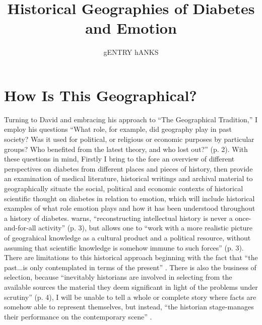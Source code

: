 \documentclass[12pt]{article}
\title{Historical Geographies of Diabetes and Emotion}
\author{gENTRY hANKS}
\begin{document}
\maketitle



\newpage
\section{How Is This Geographical?}
\doublespacing
Turning to David \citet{livingstone_geographical_1993} and embracing his approach to ``The Geographical Tradition,'' I employ his questions ``What role, for example, did geography play in past society? Was it used for political, or religious or economic purposes by particular groups? Who benefited from the latest theory, and who lost out?'' (p. 2).  With these questions in mind, Firstly I bring to the fore an overview of different perspectives on diabetes from different places and pieces of history, then provide an examination of medical literature, historical writings and archival material to geographically situate the social, political and economic contexts of historical scientific thought on diabetes in relation to emotion, which will include historical examples of what role emotion plays and how it has been understood throughout a history of diabetes. \citet{livingstone_geographical_1993} warns, ``reconstructing intellectual history is never a once-and-for-all activity'' (p. 3), but allows one to ``work with a more realistic picture of geograhical knowledge as a cultural product and a political resource, without assuming that scientific knowledge is somehow immune to such forces'' (p. 3). There are limitations to this historical approach beginning with the fact that ``the past...is only contemplated in terms of the present'' \citep[p. 3]{livingstone_geographical_1993}. There is also the business of selection, because ``inevitably historians are involved in selecting from the available sources the material they deem significant in light of the problems under scrutiny'' (p. 4), I will be unable to tell a whole or complete story where facts are somehow able to represent themselves, but instead, ``the historian stage-manages their performance on the contemporary scene'' \citep[p. 5]{livingstone_geographical_1993}. 
\end{document}
